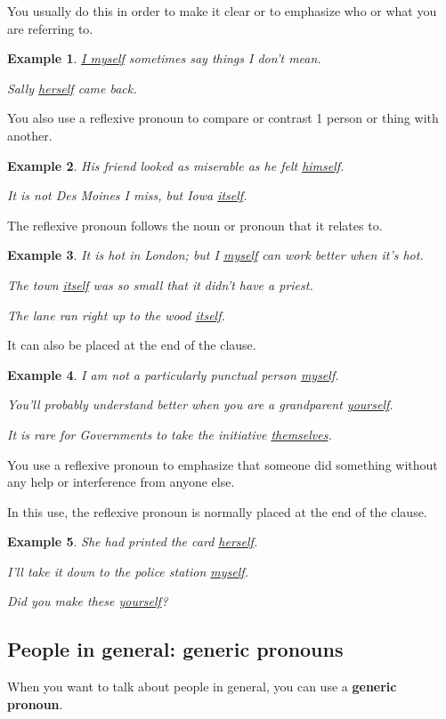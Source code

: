 \documentclass[oneside]{book}
\numberwithin{equation}{section}
\newtheorem{example}{Example}[section]
\begin{document}
You usually do this in order to make it clear or to emphasize who or what you are referring to.
\begin{example}
    \underline{I myself} sometimes say things I don't mean.
    
    Sally \underline{herself} came back.
\end{example}
You also use a reflexive pronoun to compare or contrast 1 person or thing with another.
\begin{example}
    His friend looked as miserable as he felt \underline{himself}.
    
    It is not Des Moines I miss, but Iowa \underline{itself}.
\end{example}
The reflexive pronoun follows the noun or pronoun that it relates to.
\begin{example}
    It is hot in London; but I \underline{myself} can work better when it's hot.
    
    The town \underline{itself} was so small that it didn't have a priest.
    
    The lane ran right up to the wood \underline{itself}.
\end{example}
It can also be placed at the end of the clause.
\begin{example}
    I am not a particularly punctual person \underline{myself}.
    
    You'll probably understand better when you are a grandparent \underline{yourself}.
    
    It is rare for Governments to take the initiative \underline{themselves}.
\end{example}
%
\noindent{} You use a reflexive pronoun to emphasize that someone did something without any help or interference from anyone else.

In this use, the reflexive pronoun is normally placed at the end of the clause.
\begin{example}
    She had printed the card \underline{herself}.
    
    I'll take it down to the police station \underline{myself}.
    
    Did you make these \underline{yourself}?
\end{example}

\subsection{People in general: generic pronouns}
\noindent{} When you want to talk about people in general, you can use a \textbf{generic pronoun}.
\end{document}
